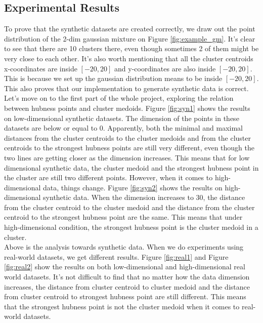 \documentclass[11pt]{article}
\begin{document}
\subsection{Experimental Results}
To prove that the synthetic datasets are created correctly, we draw out the point distribution of the 2-dim gaussian mixture on Figure \ref{fig:example_gm}. It's clear to see that there are 10 clusters there, even though sometimes 2 of them might be very close to each other. It's also worth mentioning that all the cluster centroids x-coordinates are inside $[-20, 20]$ and y-coordinates are also inside $[-20, 20]$. This is because we set up the gaussian distribution means to be inside $[-20, 20]$. This also proves that our implementation to generate synthetic data is correct.\\
Let's move on to the first part of the whole project, exploring the relation between hubness points and cluster medoids. Figure \ref{fig:syn1} shows the results on low-dimensional synthetic datasets. The dimension of the points in these datasets are below or equal to 0. Apparently, both the minimal and maximal distances from the cluster centroids to the cluster medoids and from the cluster centroids to the strongest hubness points are still very different, even though the two lines are getting closer as the dimension increases. This means that for low dimensional synthetic data, the cluster medoid and the strongest hubness point in the cluster are still two different points. However, when it comes to high-dimensional data, things change. Figure \ref{fig:syn2} shows the results on high-dimensional synthetic data. When the dimension increases to 30, the distance from the cluster centroid to the cluster medoid and the distance from the cluster centroid to the strongest hubness point are the same. This means that under high-dimensional condition, the strongest hubness point is the cluster medoid in a cluster.\\
Above is the analysis towards synthetic data. When we do experiments using real-world datasets, we get different results. Figure \ref{fig:real1} and Figure \ref{fig:real2} show the results on both low-dimensional and high-dimensional real world datasets. It's not difficult to find that no matter how the data dimension increases, the distance from cluster centroid to cluster medoid and the distance from cluster centroid to strongest hubness point are still different. This means that the strongest hubness point is not the cluster medoid when it comes to real-world datasets.\\
\end{document}
